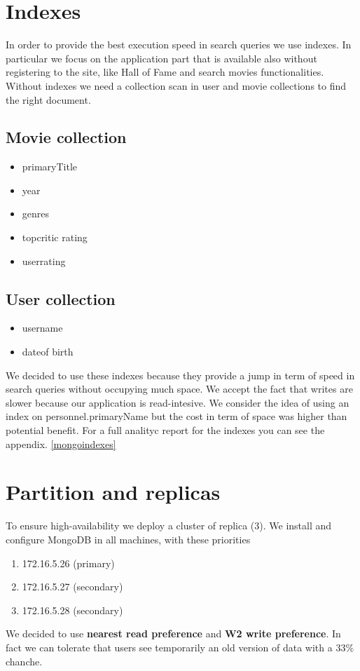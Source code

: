 \section{Indexes}
In order to provide the best execution speed in search queries we use indexes. In particular we focus on the application part that is available also without registering to the site, like Hall of Fame and search movies functionalities. Without indexes we need a collection scan in user and movie collections to find the right document. \\
\subsection{Movie collection}
\begin{itemize}
\item primaryTitle
\item year
\item genres
\item top\textunderscore critic \textunderscore rating
\item user\textunderscore rating
\end{itemize}


\subsection{User collection}
\begin{itemize}
\item username
\item date\textunderscore of \textunderscore birth
\end{itemize}


We decided to use these indexes because they provide a jump in term of speed in search queries without occupying much space. We accept the fact that writes are slower because our application is read-intesive. We consider the idea of using an index on personnel.primaryName but the cost in term of space was higher than potential benefit.
For a full analityc report for the indexes you can see the appendix. \cref{mongoindexes}
\section{Partition and replicas}
To ensure high-availability we deploy a cluster of replica (3). We install and configure MongoDB in all machines, with these priorities 
\begin{enumerate}
 \item 172.16.5.26 (primary)
 \item 172.16.5.27 (secondary)
 \item 172.16.5.28 (secondary)
 \end{enumerate} 
We decided to use \textbf{nearest read preference} and \textbf{W2 write preference}. In fact we can tolerate that users see temporarily an old version of data with a 33\% chanche. 
 